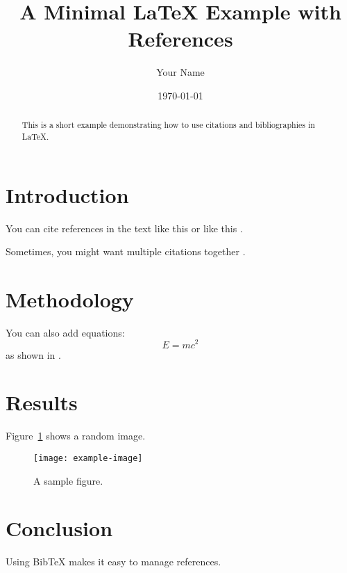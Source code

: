 \documentclass[a4paper,12pt]{article}
\title{A Minimal LaTeX Example with References}
\author{Your Name}
\date{\today}
\begin{document}
\maketitle

\begin{abstract}
This is a short example demonstrating how to use citations and bibliographies in \LaTeX.
\end{abstract}

\section{Introduction}
You can cite references in the text like this \cite{lamport1994latex} or like this \citep{knuth1984tex}.

Sometimes, you might want multiple citations together \citep{knuth1984tex,mittelbach2004latex}.

\section{Methodology}
You can also add equations:
\begin{equation}
    E = mc^2
\end{equation}
as shown in \cite{einstein1905}.

\section{Results}
Figure~\ref{fig:example} shows a random image.

\begin{figure}[h]
    \centering
    \texttt{[image: example-image]} %
    \caption{A sample figure.}
    \label{fig:example}
\end{figure}

\section{Conclusion}
Using BibTeX makes it easy to manage references.

\printbibliography
\end{document}
